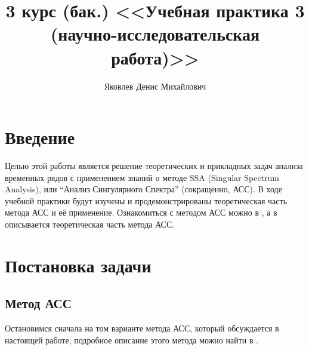 \documentclass[specialist,
               substylefile = spbu_report.rtx,
               subf,href,colorlinks=true, 12pt]{disser}
\begin{document}
	

\title{3 курс (бак.) <<Учебная практика 3 (научно-исследовательская работа)>>}


\author{Яковлев Денис Михайлович}


\date{\number\year}

\maketitle
\maketitle
\tableofcontents
\section{Введение}
Целью этой работы является решение теоретических и прикладных задач анализа временных рядов с применением знаний о методе SSA (Singular Spectrum Analysis), или ``Анализ Сингулярного Спектра'' (сокращенно, АСС). В ходе учебной практики будут изучены и продемонстрированы теоретическая часть метода АСС и её применение. Ознакомиться с методом АСС можно в \cite{GNZh01}, а в  \cite{Nekrutkin10} описывается теоретическая часть метода АСС.

\section{Постановка задачи}

\subsection{Метод АСС}
\label{ssect:SSA}
Остановимся сначала на том варианте метода АСС, который обсуждается в настоящей работе,  подробное
описание этого  метода
можно найти в \cite{GNZh01}.
\end{document}

